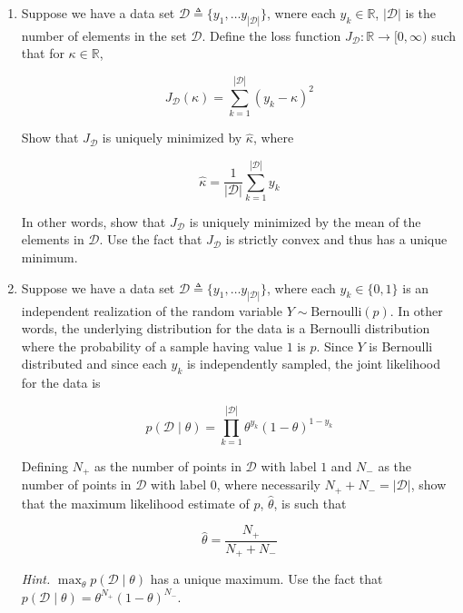 \documentclass{article}
\numberwithin{equation}{section}
\begin{document}
\begin{enumerate}
    \item
    Suppose we have a data set $ \mathcal{D} \triangleq \{y_1,
    \ldots y_{|\mathcal{D}|}\} $, wnere each $ y_k \in \mathbb{R} $,
    $ |\mathcal{D}| $ is the number of elements in the set $ \mathcal{D} $.
    Define the loss function $ J_\mathcal{D} : \mathbb{R}
    \rightarrow [0, \infty) $ such that for $ \kappa \in \mathbb{R} $,

    \begin{equation*}
        J_\mathcal{D}(\kappa) = \sum_{k = 1}^{|\mathcal{D}|}(y_k - \kappa)^2
    \end{equation*}

    Show that $ J_\mathcal{D} $ is uniquely minimized by $ \hat{\kappa} $, where

    \begin{equation*}
        \hat{\kappa} = \frac{1}{|\mathcal{D}|}\sum_{k = 1}^{|\mathcal{D}|}y_k
    \end{equation*}

    In other words, show that $ J_\mathcal{D} $ is uniquely minimized by the
    mean of the elements in $ \mathcal{D} $. Use the fact that $ J_\mathcal{D} $
    is strictly convex and thus has a unique minimum.

    \item
    Suppose we have a data set $ \mathcal{D} \triangleq \{y_1, \ldots
    y_{|\mathcal{D}|}\} $, where each $ y_k \in \{0, 1\} $ is an independent
    realization of the random variable $ Y \sim \mathrm{Bernoulli}(p) $. In
    other words, the underlying distribution for the data is a Bernoulli
    distribution where the probability of a sample having value $ 1 $ is $ p $.
    Since $ Y $ is Bernoulli distributed and since each $ y_k $ is independently
    sampled, the joint likelihood for the data is

    \begin{equation*}
        p(\mathcal{D} \mid \theta) = \prod_{k = 1}^{|\mathcal{D}|}
        \theta^{y_k}(1 - \theta)^{1 - y_k}
    \end{equation*}

    Defining $ N_+ $ as the number of points in $ \mathcal{D} $ with label $ 1 $
    and $ N_- $ as the number of points in $ \mathcal{D} $ with label $ 0 $,
    where necessarily $ N_+ + N_- = |\mathcal{D}| $, show that the maximum
    likelihood estimate of $ p $, $ \hat{\theta} $, is such that

    \begin{equation*}
        \hat{\theta} = \frac{N_+}{N_+ + N_-}
    \end{equation*}

    \textit{Hint.} $ \max_\theta p(\mathcal{D} \mid \theta) $ has a unique
    maximum. Use the fact that $ p(\mathcal{D} \mid \theta) =
    \theta^{N_+}(1 - \theta)^{N_-} $.
\end{enumerate}
\end{document}
